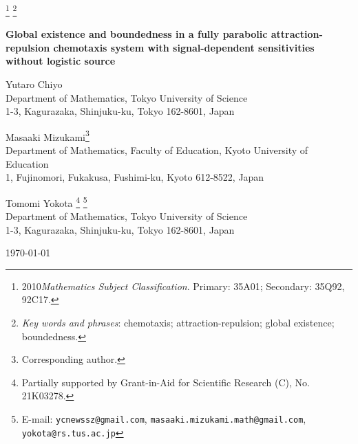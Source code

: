 \documentclass[12pt,reqno,draft]{article}
\numberwithin{equation}{section}
\theoremstyle{theorem}
\theoremstyle{definition}
\begin{document}
\footnote[0]{
    2010{\it Mathematics Subject Classification}\/. 
    Primary: 35A01; Secondary: 35Q92, 92C17.
    }
\footnote[0]{
    {\it Key words and phrases}\/:
    chemotaxis; attraction-repulsion; global existence; boundedness.
    }
\begin{center} 
    \Large{{\bf 
    Global existence and boundedness 
    in a fully parabolic 
    attraction-repulsion chemotaxis system
    with signal-dependent sensitivities
    without logistic source
    }}%
\end{center}
\vspace{5pt}
\begin{center}
    Yutaro Chiyo\\%
    \vspace{2mm}
    Department of Mathematics, 
    Tokyo University of Science\\
    1-3, Kagurazaka, Shinjuku-ku, 
    Tokyo 162-8601, Japan\\
    \vspace{6mm}

    Masaaki Mizukami\footnote{Corresponding author.}\\
    \vspace{2mm}
    Department of Mathematics, Faculty of Education, 
    Kyoto University of Education \\
    1, Fujinomori, Fukakusa, Fushimi-ku, Kyoto 
    612-8522, Japan\\
    \vspace{6mm}

    Tomomi Yokota%
      \footnote{Partially supported by Grant-in-Aid for
      Scientific Research (C), No.\,21K03278.}
    \footnote[0]{
    E-mail: 
    {\tt ycnewssz@gmail.com}, %
    {\tt masaaki.mizukami.math@gmail.com}, 
    {\tt yokota@rs.tus.ac.jp}%
    }\\
    \vspace{2mm}
    Department of Mathematics, 
    Tokyo University of Science\\
    1-3, Kagurazaka, Shinjuku-ku, 
    Tokyo 162-8601, Japan\\
    \vspace{2pt}
\end{center}
\begin{center}    
    \small \today
\end{center}
\end{document}
